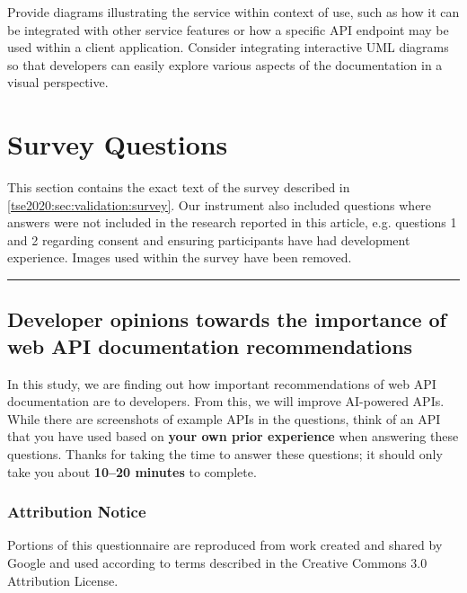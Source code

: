 \begin{leftbar}\SuggestedImprovement
Provide diagrams illustrating the service within context of use, such as how it can be integrated with other service features or how a specific API endpoint may be used within a client application. Consider integrating interactive UML diagrams so that developers can easily explore various aspects of the documentation in a visual perspective.
\end{leftbar}

\clearpage
\section{Survey Questions}\label{tse2020:sec:survey}

\def\AgreementScale{{\footnotesize \textit{[Strongly agree, Somewhat agree, Neither agree nor disagree, Somewhat disagree, Strongly disagree]}\bigskip}}

\noindent
This section contains the exact text of the survey described in \cref{tse2020:sec:validation:survey}. Our instrument also included questions where answers were not included in the research reported in this article, e.g. questions 1 and 2 regarding consent and ensuring participants have had development experience. Images used within the survey have been removed.

\bigskip
\hrule\sffamily\small

\subsection*{Developer opinions towards the importance of web API documentation recommendations}\noindent
In this study, we are finding out how important recommendations of web API documentation are to developers. From this, we will improve AI-powered APIs. While there are screenshots of example APIs in the questions, think of an API that you have used based on \textbf{your own prior experience} when answering these questions.   Thanks for taking the time to answer these questions; it should only take you about \textbf{10--20 minutes} to complete. 

\subsubsection*{Attribution Notice}\noindent
Portions of this questionnaire are reproduced from work created and shared by Google and used according to terms described in the Creative Commons 3.0 Attribution License. 

